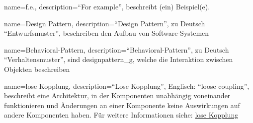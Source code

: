 {
    name=f.e.,
    description={\enquote{For example}, beschreibt (ein) Beispiel(e).}
}

{
    name=Design Pattern,
    description={\enquote{Design Pattern}, zu Deutsch \enquote{Entwurfsmuster}, beschreiben den Aufbau von Software-Systemen}
}

{
    name=Behavioral-Pattern,
    description={\enquote{Behavioral-Pattern}, zu Deutsch \enquote{Verhaltensmuster}, sind \gls{designpattern_g}, welche die Interaktion zwischen Objekten beschreiben}
}

{
    name=lose Kopplung,
    description={\enquote{Lose Kopplung}, Englisch: \enquote{loose coupling}, beschreibt eine Architektur, in der Komponenten unabhängig voneinander funktionieren und Änderungen an einer Komponente keine Auswirkungen auf andere Komponenten haben. Für weitere Informationen siehe: \hyperref[ref:looseCoupling]{lose Kopplung}}
}
